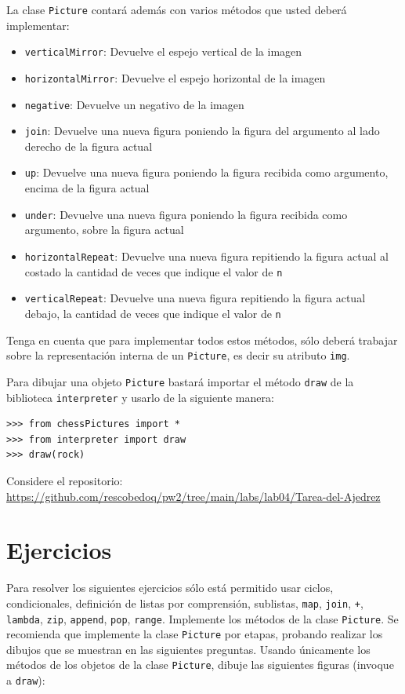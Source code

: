 \documentclass{article}
\begin{document}
La clase \texttt{Picture} contará además con varios métodos que usted deberá implementar:
\begin{itemize}
    \item \texttt{verticalMirror}: Devuelve el espejo vertical de la imagen
    \item \texttt{horizontalMirror}: Devuelve el espejo horizontal de la imagen
    \item \texttt{negative}: Devuelve un negativo de la imagen
    \item \texttt{join}: Devuelve una nueva figura poniendo la figura del argumento al lado derecho de la figura actual
    \item \texttt{up}: Devuelve una nueva figura poniendo la figura recibida como argumento, encima de la figura actual
    \item \texttt{under}: Devuelve una nueva figura poniendo la figura recibida como argumento, sobre la figura actual
    \item \texttt{horizontalRepeat}: Devuelve una nueva figura repitiendo la figura actual al costado la cantidad de veces que indique el valor de \texttt{n}
    \item \texttt{verticalRepeat}: Devuelve una nueva figura repitiendo la figura actual debajo, la cantidad de veces que indique el valor de \texttt{n}
\end{itemize}

Tenga en cuenta que para implementar todos estos métodos, sólo deberá trabajar sobre la representación interna de un \texttt{Picture}, es decir su atributo \texttt{img}.

Para dibujar una objeto \texttt{Picture} bastará importar el método \texttt{draw} de la biblioteca \texttt{interpreter} y usarlo de la siguiente manera:

\begin{verbatim}
>>> from chessPictures import *
>>> from interpreter import draw
>>> draw(rock)
\end{verbatim}

Considere el repositorio:
\url{https://github.com/rescobedoq/pw2/tree/main/labs/lab04/Tarea-del-Ajedrez}

\section{Ejercicios}
Para resolver los siguientes ejercicios sólo está permitido usar ciclos, condicionales, definición de listas por comprensión, sublistas, \texttt{map}, \texttt{join}, \texttt{+}, \texttt{lambda}, \texttt{zip}, \texttt{append}, \texttt{pop}, \texttt{range}. Implemente los métodos de la clase \texttt{Picture}. Se recomienda que implemente la clase \texttt{Picture} por etapas, probando realizar los dibujos que se muestran en las siguientes preguntas. Usando únicamente los métodos de los objetos de la clase \texttt{Picture}, dibuje las siguientes figuras (invoque a \texttt{draw}):
\end{document}
